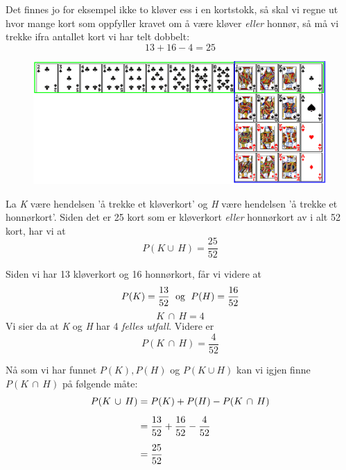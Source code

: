 Det finnes jo for eksempel ikke to kløver ess i en kortstokk, så skal vi regne ut hvor mange kort som oppfyller kravet om å være kløver \textsl{eller} honnør, så må vi trekke ifra antallet kort vi har telt dobbelt:
$$ 13+16-4=25 $$
	\begin{figure}[H]
		\centering
		\includegraphics[scale=0.45]{kort3}
	\end{figure}

La \textit{K} være hendelsen 'å trekke et kløverkort' og \textit{H} være hendelsen 'å trekke et honnørkort'. Siden det er 25 kort som er kløverkort \textsl{eller} honnørkort av i alt 52 kort, har vi at
$$P(K\cup\,H)=\frac{25}{52}$$

Siden vi har 13 kløverkort og 16 honnørkort, får vi videre at
$$P(K)=\frac{13}{52} \text{\; og \;} P(H)=\frac{16}{52}$$
\qquad
{} \vs
\[ K\,\cap\,H=4 \]
Vi sier da at \textit{K} og \textit{H} har 4 \textit{felles utfall}.
Videre er
\[ P(K\,\cap\,H)=\frac{4}{52} \]

Nå som vi har funnet $ P(K), P(H)$ og $P(K\cup H)$ kan vi igjen finne  $P(K\,\cap\,H)$ på følgende måte:
\begin{align*}
P(K\,\cup\,H)&=P(K)+P(H)-P(K\,\cap\,H) \br
&= \frac{13}{52}+\frac{16}{52}-\frac{4}{52} \br
&= \frac{25}{52}
\end{align*}

